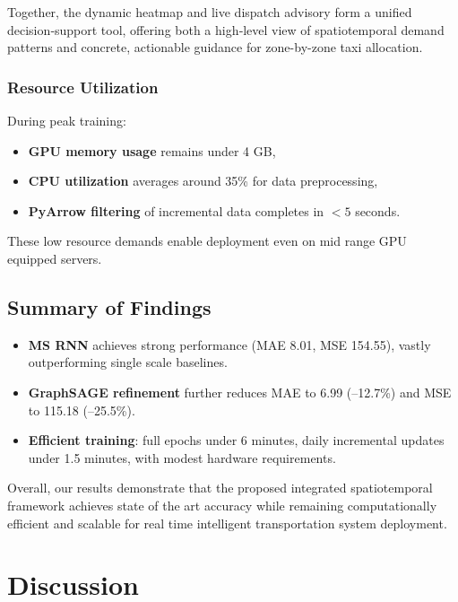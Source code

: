 \documentclass{article}
\begin{document}
Together, the dynamic heatmap and live dispatch advisory form a unified decision‐support tool, offering both a high‐level view of spatiotemporal demand patterns and concrete, actionable guidance for zone-by-zone taxi allocation.



\subsubsection{Resource Utilization}

During peak training:
\begin{itemize}
  \item \textbf{GPU memory usage} remains under 4 GB,
  \item \textbf{CPU utilization} averages around 35\% for data preprocessing,
  \item \textbf{PyArrow filtering} of incremental data completes in \(<5\) seconds.
\end{itemize}
These low resource demands enable deployment even on mid range GPU equipped servers.

\subsection{Summary of Findings}

\begin{itemize}
  \item \textbf{MS RNN} achieves strong performance (MAE 8.01, MSE 154.55), vastly outperforming single scale baselines.
  \item \textbf{GraphSAGE refinement} further reduces MAE to 6.99 (–12.7\%) and MSE to 115.18 (–25.5\%).
  \item \textbf{Efficient training}: full epochs under 6 minutes, daily incremental updates under 1.5 minutes, with modest hardware requirements.
\end{itemize}



Overall, our results demonstrate that the proposed integrated spatiotemporal framework achieves state of the art accuracy while remaining computationally efficient and scalable for real time intelligent transportation system deployment.



\section{Discussion}
\label{sec:discussion}
\end{document}
